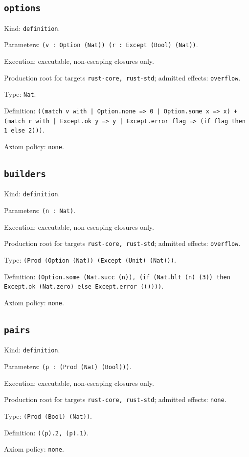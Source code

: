 \documentclass[11pt]{article}
\begin{document}
\subsection*{\texttt{options}}
\noindent Kind: \texttt{definition}.\par
\noindent Parameters: \texttt{(v : Option (Nat)) (r : Except (Bool) (Nat))}.\par
\noindent Execution: executable, non-escaping closures only.\par
\noindent Production root for targets \texttt{rust-core, rust-std}; admitted effects: \texttt{overflow}.\par
\noindent Type: \texttt{Nat}.\par
\noindent Definition: \texttt{((match v with | Option.none => 0 | Option.some x => x) + (match r with | Except.ok y => y | Except.error flag => (if flag then 1 else 2)))}.\par
\noindent Axiom policy: \texttt{none}.\par
\subsection*{\texttt{builders}}
\noindent Kind: \texttt{definition}.\par
\noindent Parameters: \texttt{(n : Nat)}.\par
\noindent Execution: executable, non-escaping closures only.\par
\noindent Production root for targets \texttt{rust-core, rust-std}; admitted effects: \texttt{overflow}.\par
\noindent Type: \texttt{(Prod (Option (Nat)) (Except (Unit) (Nat)))}.\par
\noindent Definition: \texttt{(Option.some (Nat.succ (n)), (if (Nat.blt (n) (3)) then Except.ok (Nat.zero) else Except.error (())))}.\par
\noindent Axiom policy: \texttt{none}.\par
\subsection*{\texttt{pairs}}
\noindent Kind: \texttt{definition}.\par
\noindent Parameters: \texttt{(p : (Prod (Nat) (Bool)))}.\par
\noindent Execution: executable, non-escaping closures only.\par
\noindent Production root for targets \texttt{rust-core, rust-std}; admitted effects: \texttt{none}.\par
\noindent Type: \texttt{(Prod (Bool) (Nat))}.\par
\noindent Definition: \texttt{((p).2, (p).1)}.\par
\noindent Axiom policy: \texttt{none}.\par
\end{document}

